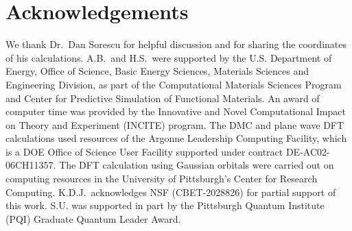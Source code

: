 \section{Acknowledgements}
We thank Dr.~Dan Sorescu for helpful discussion and for sharing the coordinates of his calculations.
A.B.~and H.S.~were supported by the U.S. Department of Energy, Office of Science, Basic Energy Sciences, Materials Sciences and Engineering Division, as part of the Computational Materials Sciences Program and Center for Predictive Simulation of Functional Materials.
An award of computer time was provided by the Innovative and Novel Computational Impact on Theory and Experiment (INCITE) program.
The DMC and plane wave DFT calculations used resources of the Argonne Leadership Computing Facility, which is a DOE Office of Science User Facility supported under contract DE-AC02-06CH11357. The DFT calculation using Gaussian orbitals were carried out on computing resources in the University of Pittsburgh's Center for Research Computing.
K.D.J.~acknowledges NSF (CBET-2028826) for partial support of this work. S.U. was supported in part by the Pittsburgh Quantum Institute (PQI) Graduate Quantum Leader Award.
